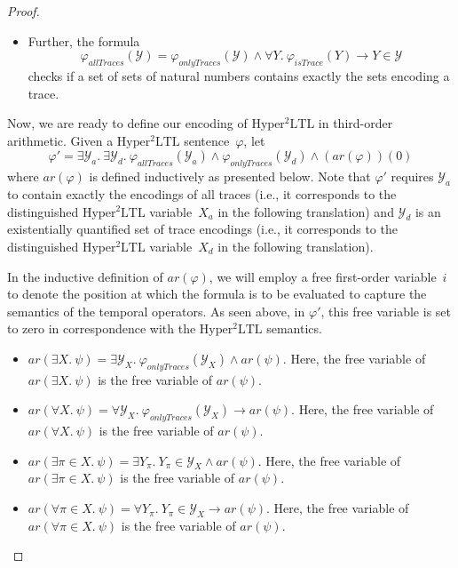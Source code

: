 \documentclass[dvipsnames,10pt,a4paper]{amsart}
\theoremstyle{definition}
\theoremstyle{remark}
\renewcommand{\phi}{\varphi}
\newcommand{\sohyltl}{\mathrm{Hyper^2LTL}\xspace}
\newcommand{\univar}{X_a}
\newcommand{\unidisvar}{X_d}
\newcommand{\arithmetize}{{\mathit{ar}}}
\newcommand{\istrace}{\mathit{isTrace}}
\newcommand{\onlytraces}{\mathit{onlyTraces}}
\newcommand{\alltraces}{\mathit{allTraces}}
\newcommand{\calY}{\mathcal{Y}}
\begin{document}
\begin{proof}
\begin{itemize}
    \item Further, the formula
    \[\phi_\alltraces(\calY) = \phi_\onlytraces(\calY) \wedge \forall Y.\ \phi_\istrace(Y) \rightarrow Y \in\calY \]
    checks if a set of sets of natural numbers contains exactly the sets encoding a trace.
\end{itemize}

Now, we are ready to define our encoding of $\sohyltl$ in third-order arithmetic.
Given a $\sohyltl$ sentence~$\phi$, let 
\[\phi' = \exists \calY_a.\ \exists\calY_d.\ \phi_\alltraces(\calY_a) \wedge \phi_\onlytraces(\calY_d)\wedge (\arithmetize(\phi))(0)\]
where $\arithmetize(\phi)$ is defined inductively as presented below.
Note that $\phi'$ requires $\calY_a$ to contain exactly the encodings of all traces (i.e., it corresponds to the distinguished $\sohyltl$ variable~$\univar$ in the following translation) and $\calY_d$ is an existentially quantified set of trace encodings (i.e., it corresponds to the distinguished $\sohyltl$ variable~$\unidisvar$ in the following translation).

In the inductive definition of $\arithmetize(\phi)$, we will employ a free first-order variable~$i$ to denote the position at which the formula is to be evaluated to capture the semantics of the temporal operators.
As seen above, in $\phi'$, this free variable is set to zero in correspondence with the $\sohyltl$ semantics.
\begin{itemize}
    
    \item $\arithmetize(\exists X.\ \psi) = \exists \calY_X.\ \phi_\onlytraces(\calY_X) \wedge \arithmetize(\psi)$. Here, the free variable of $\arithmetize(\exists X.\ \psi)$ is the free variable of $\arithmetize(\psi)$. 
    
    \item $\arithmetize(\forall X.\ \psi) = \forall \calY_X.\ \phi_\onlytraces(\calY_X) \rightarrow \arithmetize(\psi)$. Here, the free variable of $\arithmetize(\forall X.\ \psi)$ is the free variable of $\arithmetize(\psi)$.
    
    \item $\arithmetize(\exists\pi\in X.\ \psi) = \exists Y_\pi.\ Y_\pi\in \calY_X \wedge \arithmetize(\psi)$. Here, the free variable of $\arithmetize(\exists \pi \in X.\ \psi)$ is the free variable of $\arithmetize(\psi)$.
    
    \item $\arithmetize(\forall\pi\in X.\ \psi) = \forall Y_\pi.\ Y_\pi\in \calY_X \rightarrow \arithmetize(\psi)$. Here, the free variable of $\arithmetize(\forall \pi \in X.\ \psi)$ is the free variable of $\arithmetize(\psi)$.
    

\end{itemize}
\end{proof}
\end{document}
